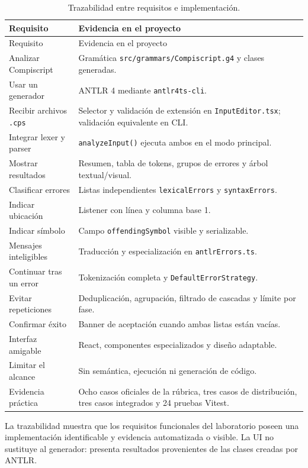 \documentclass[12pt,letterpaper,oneside]{report}
\newcommand{\archivo}[1]{\texttt{#1}}
\newcommand{\cps}{\texttt{.cps}}
\begin{document}
{\small
\begin{longtable}{p{} p{}}
\caption{Trazabilidad entre requisitos e implementación.}\label{tab:cumplimiento}\\
\toprule
Requisito & Evidencia en el proyecto \\
\midrule
\endfirsthead
\toprule
Requisito & Evidencia en el proyecto \\
\midrule
\endhead
Analizar Compiscript & Gramática \archivo{src/grammars/Compiscript.g4} y clases generadas. \\
Usar un generador & ANTLR 4 mediante \archivo{antlr4ts-cli}. \\
Recibir archivos \cps & Selector y validación de extensión en \archivo{InputEditor.tsx}; validación equivalente en CLI. \\
Integrar lexer y parser & \archivo{analyzeInput()} ejecuta ambos en el modo principal. \\
Mostrar resultados & Resumen, tabla de tokens, grupos de errores y árbol textual/visual. \\
Clasificar errores & Listas independientes \archivo{lexicalErrors} y \archivo{syntaxErrors}. \\
Indicar ubicación & Listener con línea y columna base 1. \\
Indicar símbolo & Campo \archivo{offendingSymbol} visible y serializable. \\
Mensajes inteligibles & Traducción y especialización en \archivo{antlrErrors.ts}. \\
Continuar tras un error & Tokenización completa y \archivo{DefaultErrorStrategy}. \\
Evitar repeticiones & Deduplicación, agrupación, filtrado de cascadas y límite por fase. \\
Confirmar éxito & Banner de aceptación cuando ambas listas están vacías. \\
Interfaz amigable & React, componentes especializados y diseño adaptable. \\
Limitar el alcance & Sin semántica, ejecución ni generación de código. \\
Evidencia práctica & Ocho casos oficiales de la rúbrica, tres casos de distribución, tres casos integrados y 24 pruebas Vitest. \\
\bottomrule
\end{longtable}
}

La trazabilidad muestra que los requisitos funcionales del laboratorio poseen una
implementación identificable y evidencia automatizada o visible. La UI no sustituye
al generador: presenta resultados provenientes de las clases creadas por ANTLR.
\end{document}
